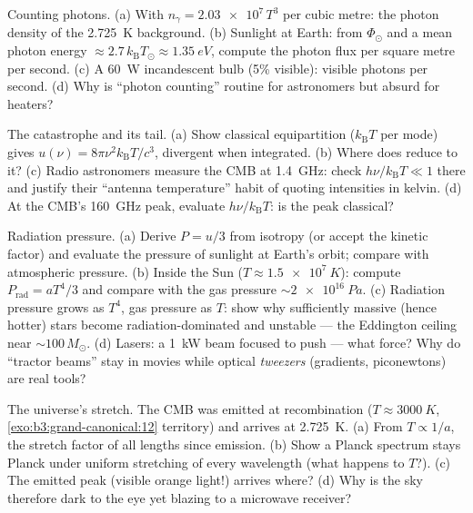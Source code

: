 \begin{exercise}[$\star$]\label{exo:b3:photons-phonons:3}
Counting photons. (a) With $n_\gamma = \num{2.03e7}\,T^3$ per
cubic metre: the photon density of the \qty{2.725}{K} background.
(b) Sunlight at Earth: from $\Phi_\odot$ and a mean photon energy
$\approx 2.7\,k_{\text{B}}T_\odot \approx \qty{1.35}{eV}$,
compute the photon flux per square metre per second. (c) A
\qty{60}{W} incandescent bulb (5\% visible): visible photons per
second. (d) Why is ``photon counting'' routine for astronomers
but absurd for heaters?
\end{exercise}

\begin{exercise}[$\star$]\label{exo:b3:photons-phonons:4}
The catastrophe and its tail. (a) Show classical equipartition
($k_{\text{B}}T$ per mode) gives $u(\nu) =
8\pi\nu^2k_{\text{B}}T/c^3$, divergent when integrated. (b) Where
does  reduce to it? (c) Radio astronomers measure the
CMB at \qty{1.4}{GHz}: check $h\nu/k_{\text{B}}T \ll 1$ there and
justify their ``antenna temperature'' habit of quoting intensities
in kelvin. (d) At the CMB's \qty{160}{GHz} peak, evaluate
$h\nu/k_{\text{B}}T$: is the peak classical?
\end{exercise}

\begin{exercise}[$\star\star$]\label{exo:b3:photons-phonons:5}
Radiation pressure. (a) Derive $P = u/3$ from isotropy (or accept
the kinetic factor) and evaluate the pressure of sunlight at
Earth's orbit; compare with atmospheric pressure. (b) Inside the
Sun ($T \approx \qty{1.5e7}{K}$): compute $P_{\text{rad}} =
aT^4/3$ and compare with the gas pressure $\sim\qty{2e16}{Pa}$.
(c) Radiation pressure grows as $T^4$, gas pressure as $T$: show
why sufficiently massive (hence hotter) stars become
radiation-dominated and unstable --- the Eddington ceiling near
$\sim100\,M_\odot$. (d) Lasers: a \qty{1}{kW} beam focused to
push --- what force? Why do ``tractor beams'' stay in movies while
optical \emph{tweezers} (gradients, piconewtons) are real tools?
\end{exercise}

\begin{exercise}[$\star\star$]\label{exo:b3:photons-phonons:6}
The universe's stretch. The CMB was emitted at recombination
($T \approx \qty{3000}{K}$, \cref{exo:b3:grand-canonical:12}
territory) and arrives at \qty{2.725}{K}. (a) From $T \propto
1/a$, the stretch factor of all lengths since emission. (b) Show
a Planck spectrum stays Planck under uniform stretching of every
wavelength (what happens to $T$?). (c) The emitted peak (visible
orange light!) arrives where? (d) Why is the sky therefore dark
to the eye yet blazing to a microwave receiver?
\end{exercise}

